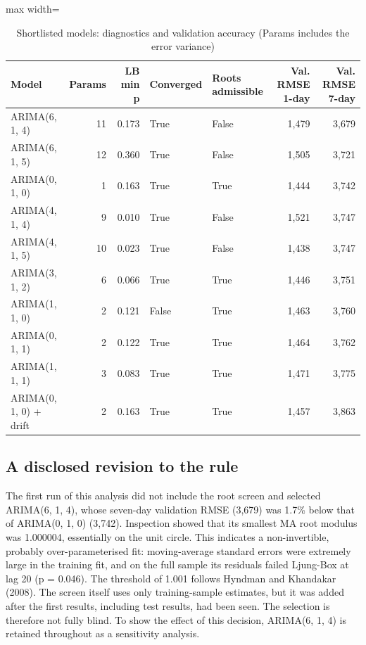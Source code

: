 \documentclass[11pt,a4paper]{article}
\begin{document}
\begin{table}[H]
\centering
\caption{Shortlisted models: diagnostics and validation accuracy (Params includes the error variance)}
\footnotesize
\setlength{\tabcolsep}{4pt}
\begin{adjustbox}{max width=\linewidth}
\begin{tabular}{lrrllrr}
\toprule
\textbf{Model} & \textbf{Params} & \textbf{LB min p} & \textbf{Converged} & \textbf{Roots admissible} & \textbf{Val. RMSE 1-day} & \textbf{Val. RMSE 7-day} \\
\midrule
ARIMA(6, 1, 4) & 11 & 0.173 & True & False & 1,479 & 3,679 \\
ARIMA(6, 1, 5) & 12 & 0.360 & True & False & 1,505 & 3,721 \\
ARIMA(0, 1, 0) & 1 & 0.163 & True & True & 1,444 & 3,742 \\
ARIMA(4, 1, 4) & 9 & 0.010 & True & False & 1,521 & 3,747 \\
ARIMA(4, 1, 5) & 10 & 0.023 & True & False & 1,438 & 3,747 \\
ARIMA(3, 1, 2) & 6 & 0.066 & True & True & 1,446 & 3,751 \\
ARIMA(1, 1, 0) & 2 & 0.121 & False & True & 1,463 & 3,760 \\
ARIMA(0, 1, 1) & 2 & 0.122 & True & True & 1,464 & 3,762 \\
ARIMA(1, 1, 1) & 3 & 0.083 & True & True & 1,471 & 3,775 \\
ARIMA(0, 1, 0) + drift & 2 & 0.163 & True & True & 1,457 & 3,863 \\
\bottomrule
\end{tabular}
\end{adjustbox}
\end{table}

\subsection{A disclosed revision to the rule}

The first run of this analysis did not include the root screen and selected ARIMA(6, 1, 4), whose seven-day validation RMSE (3,679) was 1.7\% below that of ARIMA(0, 1, 0) (3,742). Inspection showed that its smallest MA root modulus was 1.000004, essentially on the unit circle. This indicates a non-invertible, probably over-parameterised fit: moving-average standard errors were extremely large in the training fit, and on the full sample its residuals failed Ljung-Box at lag 20 (p = 0.046). The threshold of 1.001 follows Hyndman and Khandakar (2008). The screen itself uses only training-sample estimates, but it was added after the first results, including test results, had been seen. The selection is therefore not fully blind. To show the effect of this decision, ARIMA(6, 1, 4) is retained throughout as a sensitivity analysis.
\end{document}
